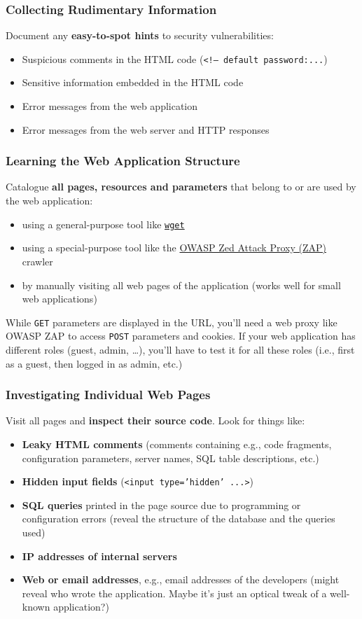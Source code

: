 \documentclass[aspectratio=169]{beamer}
\begin{document}
\begin{frame}
    \frametitle{Collecting Rudimentary Information}
    Document any \textbf{easy-to-spot hints} to security vulnerabilities:
    \begin{itemize}
        \item Suspicious comments in the HTML code (\texttt{<!-- default password:...})
        \item Sensitive information embedded in the HTML code
        \item Error messages from the web application
        \item Error messages from the web server and HTTP responses
    \end{itemize}
\end{frame}


\begin{frame}
    \frametitle{Learning the Web Application Structure}
    Catalogue \textbf{all pages, resources and parameters} that belong to or are used by the web application:
    \begin{itemize}
        \item using a general-purpose tool like \href{https://www.gnu.org/software/wget/}{\texttt{wget}}
        \item using a special-purpose tool like the \href{https://www.zaproxy.org/}{OWASP Zed Attack Proxy (ZAP)} crawler
        \item by manually visiting all web pages of the application (works well for small web applications)
    \end{itemize}
    \vfill
    While \texttt{GET} parameters are displayed in the URL, you'll need a web proxy like OWASP ZAP to access \texttt{POST} parameters and cookies.
    \vfill
    If your web application has different roles (guest, admin, \ldots), you'll have to test it for all these roles (i.e., first as a guest, then logged in as admin, etc.)
\end{frame}

\begin{frame}
    \frametitle{Investigating Individual Web Pages}
    Visit all pages and \textbf{inspect their source code}. Look for things like:
    \begin{itemize}
        \item \textbf{Leaky HTML comments} (comments containing e.g., code fragments, configuration parameters, server names, SQL table descriptions, etc.)
        \item \textbf{Hidden input fields} (\texttt{<input type='hidden' ...>})
        \item \textbf{SQL queries} printed in the page source due to programming or configuration errors (reveal the structure of the database and the queries used)
        \item \textbf{IP addresses of internal servers}
        \item \textbf{Web or email addresses}, e.g., email addresses of the developers (might reveal who wrote the application. Maybe it's just an optical tweak of a well-known application?)
    \end{itemize} 
    

\end{frame}
\end{document}
